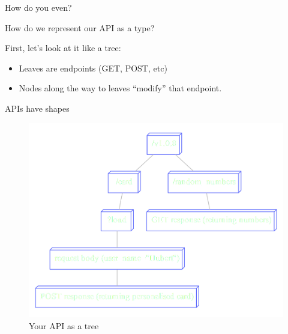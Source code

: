 \documentclass[ignorenonframetext,]{beamer}
\begin{document}
\begin{frame}{How do you even?}

How do we represent our API as a type?

First, let's look at it like a tree:

\begin{itemize}[<+->]
\itemsep1pt\parskip0pt
\item
  Leaves are endpoints (GET, POST, etc)
\item
  Nodes along the way to leaves ``modify'' that endpoint.
\end{itemize}

\end{frame}

\begin{frame}{APIs have shapes}

\begin{figure}[htbp]
\centering
\includegraphics{tree.png}
\caption{Your API as a tree}
\end{figure}

\end{frame}
\end{document}
